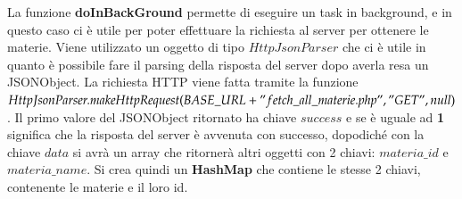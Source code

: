 \documentclass[a4paper, 50pt, twoside]{article}
\begin{document}
La funzione \textbf{doInBackGround} permette di eseguire un task in background, e in questo caso ci è utile per poter effettuare la richiesta al server per ottenere le materie. Viene utilizzato un oggetto di tipo $HttpJsonParser$ che ci è utile in quanto è possibile fare il parsing della risposta del server dopo averla resa un JSONObject. La richiesta HTTP viene fatta tramite la funzione \\$HttpJsonParser.makeHttpRequest(BASE\_URL + "fetch\_all\_materie.php", "GET", null)$.	
Il primo valore del JSONObject ritornato ha chiave $success$ e se è uguale ad \textbf{1} significa che la risposta del server è avvenuta con successo, dopodiché con la chiave $data$ si avrà un array che ritornerà altri oggetti con 2 chiavi: $materia\_id$ e  $materia\_name$.
Si crea quindi un \textbf{HashMap} che contiene le stesse 2 chiavi, contenente le materie e il loro id.
\end{document}
